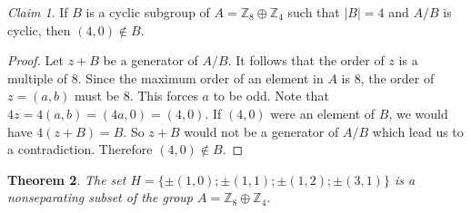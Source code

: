\documentclass[article,dvisp]{amsart}
\def\Z{\mathbb{Z}}
\newtheorem{thm}{Theorem}[section]
\theoremstyle{definition}
\theoremstyle{remark}
\newtheorem{clm}[thm]{Claim}
\numberwithin{equation}{section}
\theoremstyle{lemma}
\begin{document}
\begin{clm}\label{clm:1}
If $B$ is a cyclic subgroup of $A=\Z_{8}\oplus\Z_{4}$ such that $|B|=4$ and $A/B$ is cyclic, then $(4,0)\notin B$.
\end{clm}
\begin{proof}
Let $z+B$ be a generator of $A/B$. It follows that the order of $z$ is a multiple of $8$. Since the maximum order of an element in $A$ is $8$, the order of $z=(a,b)$ must be $8$. This forces $a$ to be odd. Note that
$4z=4(a,b)=(4a,0)=(4,0)$. If $(4,0)$ were an element of $B$, we would have $4(z+B)=B$. So $z+B$ would not be a  generator of $A/B$ which lead us to a contradiction. Therefore $(4,0)\notin B$.
\end{proof}

\begin{thm} The set $H=\{\pm(1,0);\pm(1,1);\pm(1,2);\pm(3,1)\}$ is a nonseparating subset of the group $A=\Z_{8}\oplus\Z_{4}$.
\end{thm}
\end{document}
